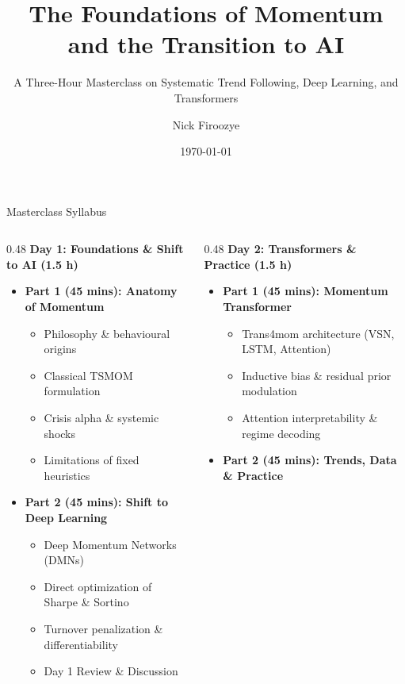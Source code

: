 \documentclass[10pt]{beamer}
\title{The Foundations of Momentum and the Transition to AI}
\subtitle{A Three-Hour Masterclass on Systematic Trend Following, Deep Learning, and Transformers}
\author{Nick Firoozye}
\institute{UCL Computer Science \& Financial Computing}
\date{\today}
\begin{document}
\begin{frame}
  \titlepage
\end{frame}

\begin{frame}{Masterclass Syllabus}
  \begin{columns}[t]
    \begin{column}{0.48\textwidth}
      \textbf{Day 1: Foundations \& Shift to AI (1.5 h)}
      \begin{itemize}\scriptsize
        \item \textbf{Part 1 (45 mins): Anatomy of Momentum}
        \begin{itemize}\tiny
          \item Philosophy \& behavioural origins
          \item Classical TSMOM formulation
          \item Crisis alpha \& systemic shocks
          \item Limitations of fixed heuristics
        \end{itemize}
        \item \textbf{Part 2 (45 mins): Shift to Deep Learning}
        \begin{itemize}\tiny
          \item Deep Momentum Networks (DMNs)
          \item Direct optimization of Sharpe \& Sortino
          \item Turnover penalization \& differentiability
          \item Day 1 Review \& Discussion
        \end{itemize}
      \end{itemize}
    \end{column}
    \begin{column}{0.48\textwidth}
      \textbf{Day 2: Transformers \& Practice (1.5 h)}
      \begin{itemize}\scriptsize
        \item \textbf{Part 1 (45 mins): Momentum Transformer}
        \begin{itemize}\tiny
          \item Trans4mom architecture (VSN, LSTM, Attention)
          \item Inductive bias \& residual prior modulation
          \item Attention interpretability \& regime decoding
        \end{itemize}
        \item \textbf{Part 2 (45 mins): Trends, Data \& Practice}

\end{itemize}
\end{column}
\end{columns}
\end{frame}
\end{document}
